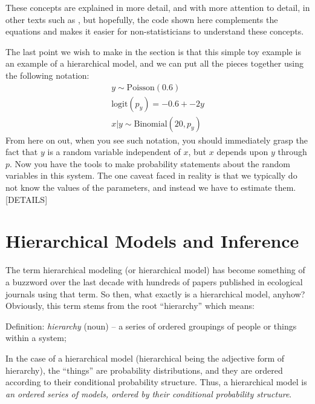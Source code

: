 These concepts are explained in more detail, and with more attention
to detail, in other texts such as \citet{casella_burger:2001}, but hopefully, the
code shown here complements the equations and makes it easier for
non-statisticians to understand these concepts.

The last point we wish
to make in the section is that this simple toy example is an example
of a hierarchical model, and we can put all the pieces together using
the following notation:
\begin{gather}
  y \sim \text{Poisson}(0.6) \\
  \text{logit}(p_y) = -0.6 + -2y \\
  x|y \sim \text{Binomial}(20, p_y)
\end{gather}
From here on out, when you see such notation, you should immediately
grasp the fact that $y$ is a random variable independent of $x$, but
$x$ depends upon $y$ through $p$. Now you have the tools to make
probability statements about the random variables in this system. The
one caveat faced in reality is that we typically do not know the
values of the parameters, and instead we have to estimate them.[DETAILS]









\section{Hierarchical Models and Inference}

The term hierarchical modeling (or hierarchical model) has become
something of a buzzword over the last decade with hundreds of papers
published in ecological journals using that term.  So then, what
exactly is a hierarchical model, anyhow? Obviously, this term stems
from the root ``hierarchy'' which means:

\vspace{.1in}

{\flushleft
Definition: {\it hierarchy} (noun) -- a series of ordered groupings of people or things within a system;
}

\vspace{.1in}

In the case of a hierarchical model (hierarchical being the adjective
form of hierarchy), the ``things'' are probability distributions, and
they are ordered according to their conditional probability structure.
Thus, a hierarchical model is {\it an ordered series of models,
  ordered by their conditional probability structure}.

